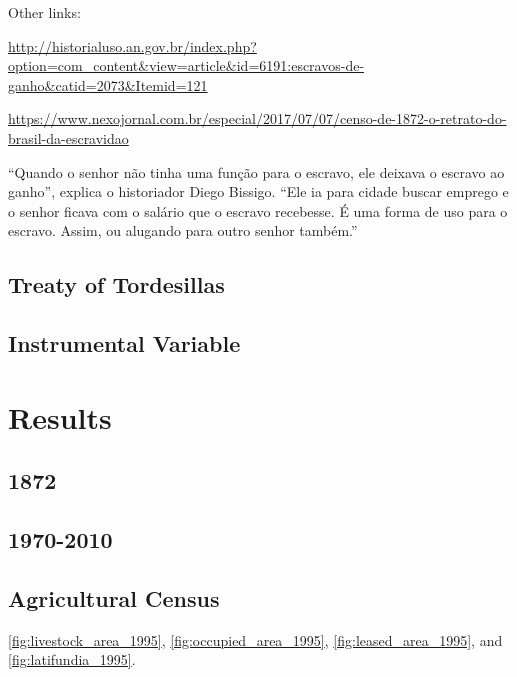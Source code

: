 \documentclass{article}
\begin{document}
Other links:

\url{http://historialuso.an.gov.br/index.php?option=com_content&view=article&id=6191:escravos-de-ganho&catid=2073&Itemid=121}

\url{https://www.nexojornal.com.br/especial/2017/07/07/censo-de-1872-o-retrato-do-brasil-da-escravidao}

“Quando o senhor não tinha uma função para o escravo, ele deixava o escravo ao ganho”, explica o historiador Diego Bissigo. “Ele ia para cidade buscar emprego e o senhor ficava com o salário que o escravo recebesse. É uma forma de uso para o escravo. Assim, ou alugando para outro senhor também.”



\parencite[p.~142]{De_Oliveira_Andrade1980-xz}

\subsection{Treaty of Tordesillas}

\subsection{Instrumental Variable}

\section{Results}


\subsection{1872}

\subsection{1970-2010}

\subsection{Agricultural Census}

\autoref{fig:livestock_area_1995}, \autoref{fig:occupied_area_1995}, \autoref{fig:leased_area_1995}, and \autoref{fig:latifundia_1995}.

\clearpage



\printbibliography
\end{document}
